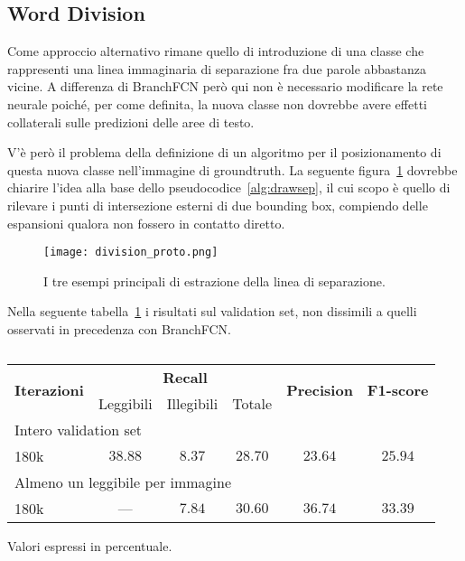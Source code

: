 \subsection{Word Division}
\label{subsec:train_wd}
Come approccio alternativo rimane quello di introduzione di una classe che rappresenti una linea immaginaria di separazione fra due parole abbastanza vicine. A differenza di BranchFCN però qui non è necessario modificare la rete neurale poiché, per come definita, la nuova classe non dovrebbe avere effetti collaterali sulle predizioni delle aree di testo.\par
V'è però il problema della definizione di un algoritmo per il posizionamento di questa nuova classe nell'immagine di groundtruth. La seguente figura~\ref{fig:division_proto} dovrebbe chiarire l'idea alla base dello pseudocodice~\ref{alg:drawsep}, il cui scopo è quello di rilevare i punti di intersezione esterni di due bounding box, compiendo delle espansioni qualora non fossero in contatto diretto.

\begin{figure}[H]
	\centering
	\texttt{[image: division\_proto.png]}
	\caption{I tre esempi principali di estrazione della linea di separazione.}
\label{fig:division_proto}
\end{figure}

Nella seguente tabella~\ref{tab:word} i risultati sul validation set, non dissimili a quelli osservati in precedenza con BranchFCN.\par

\begin{table}[H]
\centering
\begin{threeparttable}
	\begin{tabular}{l*{5}c}
		\toprule
		\multirow{2}{*}{\textbf{Iterazioni}} & \multicolumn{3}{c}{\textbf{Recall}} & \multirow{2}{*}{\textbf{Precision}} & \multirow{2}{*}{\textbf{F1-score}} \\
		\cmidrule(lr){2-4}
		& Leggibili & Illegibili & Totale &  &  \\
		\midrule
		\multicolumn{6}{l}{Intero validation set} \\
		180k		& $38.88$ & $8.37$ & $28.70$ & $23.64$ & $25.94$ \\
		\midrule
		\multicolumn{6}{l}{Almeno un leggibile per immagine} \\
		180k		&   ---   & $7.84$ & $30.60$ & $36.74$ & $33.39$ \\
		\bottomrule
	\end{tabular}
	\begin{tablenotes}
		\item \footnotesize{Valori espressi in percentuale.}
	\end{tablenotes}
\end{threeparttable}
\caption{}\label{tab:word}
\end{table}


